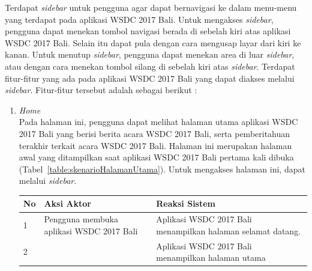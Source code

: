 Terdapat {\it sidebar} untuk pengguna agar dapat bernavigasi ke dalam menu-menu yang terdapat pada aplikasi WSDC 2017 Bali. Untuk mengakses {\it sidebar}, pengguna dapat menekan tombol navigasi berada di sebelah kiri atas aplikasi WSDC 2017 Bali. Selain itu dapat pula dengan cara mengusap layar dari kiri ke kanan. Untuk menutup {\it sidebar}, pengguna dapat menekan area di luar {\it sidebar}, atau dengan cara menekan tombol silang di sebelah kiri atas {\it sidebar}. Terdapat fitur-fitur yang ada pada aplikasi WSDC 2017 Bali yang dapat diakses melalui {\it sidebar}. Fitur-fitur tersebut adalah sebagai berikut :
\begin{enumerate}
	\item \textit{Home} \\
	Pada halaman ini, pengguna dapat melihat halaman utama aplikasi WSDC 2017 Bali yang berisi berita acara WSDC 2017 Bali, serta pemberitahuan terakhir terkait acara WSDC 2017 Bali. Halaman ini merupakan halaman awal yang ditampilkan saat aplikasi WSDC 2017 Bali pertama kali dibuka (Tabel~\ref{table:skenarioHalamanUtama}). Untuk mengakses halaman ini, dapat melalui \textit{sidebar}.
		\begin{table}[H]
			\centering
			\begin{tabular}{|p{0.5cm}|p{7cm}|p{7cm}|}
				\hline
				No & Aksi Aktor                               & Reaksi Sistem                                          \\ \hline
				1  & Pengguna membuka aplikasi WSDC 2017 Bali & Aplikasi WSDC 2017 Bali menampilkan halaman selamat datang. \\ \hline
				2  &                                          & Aplikasi WSDC 2017 Bali menampilkan halaman utama           \\ \hline

\end{tabular}
\end{table}
\end{enumerate}
